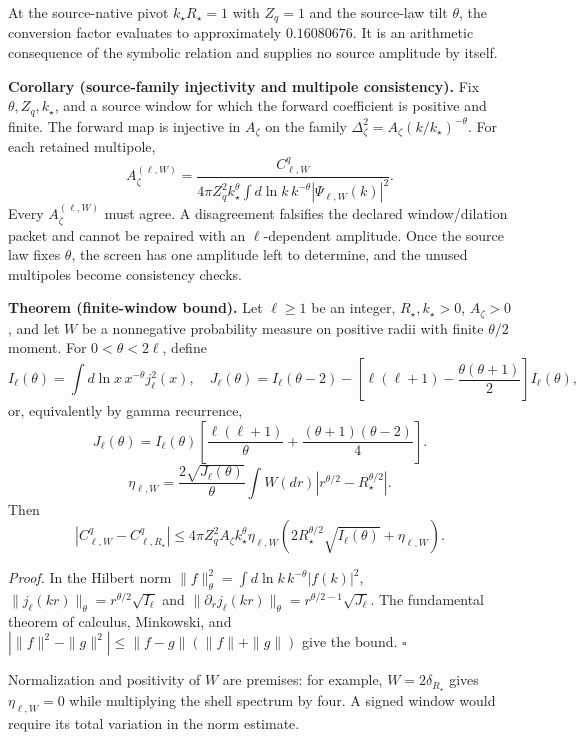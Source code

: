 At the source-native pivot $k_\star R_\star=1$ with $Z_q=1$ and the
source-law tilt $\theta$, the conversion factor evaluates to approximately
$0.16080676$.  It is an arithmetic consequence of the symbolic relation and
supplies no source amplitude by itself.

\textbf{Corollary (source-family injectivity and multipole consistency).}
\label{cor:oph330-source-family-injectivity}
Fix \(\theta,Z_q,k_\star\), and a source window for which the forward
coefficient is positive and finite. The forward map is injective in
\(A_\zeta\) on the family
\(\Delta_\zeta^2=A_\zeta(k/k_\star)^{-\theta}\). For each retained multipole,
\[
A_\zeta^{(\ell,W)}
=\frac{C_{\ell,W}^q}
{4\pi Z_q^2k_\star^\theta
\int d\ln k\,k^{-\theta}|\Psi_{\ell,W}(k)|^2}.
\]
Every \(A_\zeta^{(\ell,W)}\) must agree. A disagreement falsifies the declared
window/dilation packet and cannot be repaired with an \(\ell\)-dependent
amplitude. Once the source law fixes \(\theta\), the screen has one amplitude
left to determine, and the unused multipoles become consistency checks.

\textbf{Theorem (finite-window bound).}
\label{thm:oph330-finite-window-bound}
Let $\ell\ge1$ be an integer, $R_\star,k_\star>0$, $A_\zeta>0$, and let
$W$ be a nonnegative probability measure on positive radii with finite
$\theta/2$ moment. For $0<\theta<2\ell$, define
\[
 I_\ell(\theta)=\int d\ln x\,x^{-\theta}j_\ell^2(x),
\quad
 J_\ell(\theta)=I_\ell(\theta-2)
 -\left[\ell(\ell+1)-\frac{\theta(\theta+1)}2\right]I_\ell(\theta),
\]
or, equivalently by gamma recurrence,
\[
 J_\ell(\theta)=I_\ell(\theta)
 \left[\frac{\ell(\ell+1)}{\theta}
       +\frac{(\theta+1)(\theta-2)}4\right].
\]
\[
 \eta_{\ell,W}
 =\frac{2\sqrt{J_\ell(\theta)}}{\theta}
  \int W(dr)|r^{\theta/2}-R_\star^{\theta/2}|.
\]
Then
\[
 |C_{\ell,W}^q-C_{\ell,R_\star}^q|
 \le4\pi Z_q^2A_\zeta k_\star^\theta\eta_{\ell,W}
 \left(2R_\star^{\theta/2}\sqrt{I_\ell(\theta)}+\eta_{\ell,W}\right).
\]

\textit{Proof.}
In the Hilbert norm
$\|f\|_\theta^2=\int d\ln k\,k^{-\theta}|f(k)|^2$,
$\|j_\ell(kr)\|_\theta=r^{\theta/2}\sqrt{I_\ell}$ and
$\|\partial_rj_\ell(kr)\|_\theta=r^{\theta/2-1}\sqrt{J_\ell}$.
The fundamental theorem of calculus, Minkowski, and
$|\|f\|^2-\|g\|^2|\le\|f-g\|(\|f\|+\|g\|)$ give the bound.  \hfill$\square$

Normalization and positivity of $W$ are premises: for example,
$W=2\delta_{R_\star}$ gives $\eta_{\ell,W}=0$ while multiplying the shell
spectrum by four. A signed window would require its total variation in the
norm estimate.

